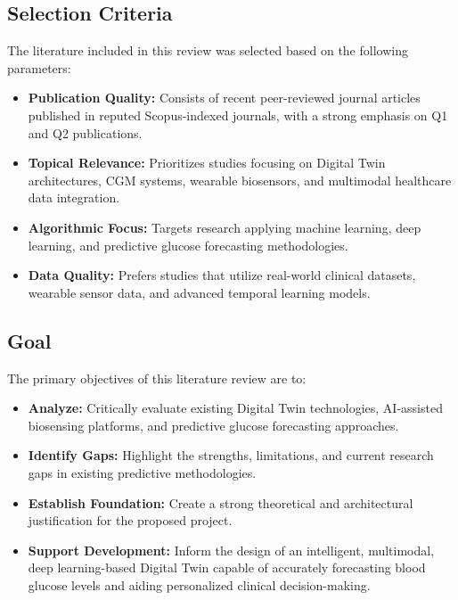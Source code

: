 \documentclass[12pt]{article}
\begin{document}
\vspace{0.3cm}

\subsection{Selection Criteria}

The literature included in this review was selected based on the following parameters:
\begin{itemize}[leftmargin=*, noitemsep]
    \item \textbf{Publication Quality:} Consists of recent peer-reviewed journal articles published in reputed Scopus-indexed journals, with a strong emphasis on Q1 and Q2 publications.
    \item \textbf{Topical Relevance:} Prioritizes studies focusing on Digital Twin architectures, CGM systems, wearable biosensors, and multimodal healthcare data integration.
    \item \textbf{Algorithmic Focus:} Targets research applying machine learning, deep learning, and predictive glucose forecasting methodologies.
    \item \textbf{Data Quality:} Prefers studies that utilize real-world clinical datasets, wearable sensor data, and advanced temporal learning models.
\end{itemize}

\vspace{0.3cm}

\subsection{Goal}

The primary objectives of this literature review are to:
\begin{itemize}[leftmargin=*, noitemsep]
    \item \textbf{Analyze:} Critically evaluate existing Digital Twin technologies, AI-assisted biosensing platforms, and predictive glucose forecasting approaches.
    \item \textbf{Identify Gaps:} Highlight the strengths, limitations, and current research gaps in existing predictive methodologies.
    \item \textbf{Establish Foundation:} Create a strong theoretical and architectural justification for the proposed project.
    \item \textbf{Support Development:} Inform the design of an intelligent, multimodal, deep learning-based Digital Twin capable of accurately forecasting blood glucose levels and aiding personalized clinical decision-making.
\end{itemize}
\end{document}
